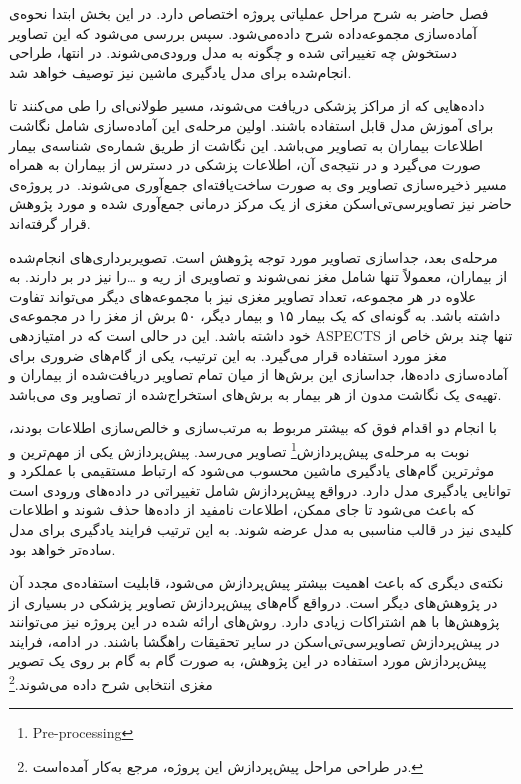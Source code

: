 

فصل حاضر به شرح مراحل عملیاتی پروژه اختصاص دارد.
در این بخش ابتدا نحوه‌ی آماده‌سازی مجموعه‌داده شرح داده‌می‌شود.
سپس بررسی می‌شود که این تصاویر دستخوش چه تغییراتی شده و چگونه به مدل ورودی‌می‌شوند.
در انتها، طراحی انجام‌شده برای مدل یادگیری ماشین نیز توصیف خواهد شد.


داده‌هایی که از مراکز پزشکی دریافت می‌شوند، مسیر طولانی‌ای را طی می‌کنند تا برای آموزش مدل قابل استفاده باشند.
اولین مرحله‌ی این آماده‌سازی شامل نگاشت اطلاعات بیماران به تصاویر می‌باشد.
این نگاشت از طریق شماره‌ی شناسه‌ی بیمار صورت می‌گیرد 
و در نتیجه‌ی آن، اطلاعات پزشکی در دسترس از بیماران به همراه مسیر ذخیره‌سازی تصاویر وی به صورت ساخت‌یافته‌ای جمع‌آوری می‌شوند.\
در پروژه‌ی حاضر نیز تصاویرسی‌تی‌اسکن مغزی از یک مرکز درمانی جمع‌آوری شده و مورد پژوهش قرار گرفته‌اند.

مرحله‌ی بعد، جداسازی تصاویر مورد توجه پژوهش است.
تصویربرداری‌های انجام‌شده از بیماران، معمولاً تنها شامل مغز نمی‌شوند و تصاویری از ریه و \dots را نیز در بر دارند.
به علاوه در هر مجموعه، تعداد تصاویر مغزی نیز با مجموعه‌های دیگر می‌تواند تفاوت داشته باشد.
به گونه‌ای که یک بیمار ۱۵ و بیمار دیگر، ۵۰ برش از مغز را در مجموعه‌ی خود داشته باشد.
این در حالی است که در امتیازدهی ASPECTS تنها چند برش خاص از مغز مورد استفاده قرار می‌گیرد.
به این ترتیب، یکی از گام‌های ضروری برای آماده‌سازی داده‌ها، جداسازی این برش‌ها از میان تمام 
تصاویر دریافت‌شده از بیماران و تهیه‌ی یک نگاشت مدون از هر بیمار به برش‌های استخراج‌شده از تصاویر وی می‌باشد.

با انجام دو اقدام فوق که بیشتر مربوط به مرتب‌سازی و خالص‌سازی اطلاعات بودند، نوبت به مرحله‌ی 
پیش‌پردازش\footnote{Pre-processing}
تصاویر می‌رسد.
پیش‌پردازش یکی از مهم‌ترین و موثرترین گام‌های یادگیری ماشین محسوب می‌شود که ارتباط مستقیمی با عملکرد و توانایی یادگیری مدل دارد. 
درواقع پیش‌پردازش شامل تغییراتی در داده‌های ورودی است که باعث می‌شود تا جای ممکن، اطلاعات نامفید از داد‌ه‌ها حذف شوند و اطلاعات کلیدی نیز در قالب مناسبی به مدل عرضه شوند.
به این ترتیب فرایند یادگیری برای مدل ساده‌تر خواهد بود.

نکته‌ی دیگری که باعث اهمیت بیشتر پیش‌پردازش می‌شود، قابلیت استفاده‌ی مجدد آن در پژوهش‌های دیگر است.
درواقع گام‌های پیش‌پردازش تصاویر پزشکی در بسیاری از پژوهش‌ها با هم اشتراکات زیادی دارد.
روش‌های ارائه شده در این پروژه نیز می‌توانند در پیش‌پردازش تصاویرسی‌تی‌اسکن در سایر تحقیقات راهگشا باشند.
در ادامه، فرایند پیش‌پردازش مورد استفاده در این پژوهش، به صورت گام به گام بر روی یک تصویر مغزی انتخابی شرح داده می‌شوند.\footnote{در طراحی مراحل پیش‌پردازش این پروژه، مرجع \cite{ma2020medical} به‌کار آمده‌است.}

